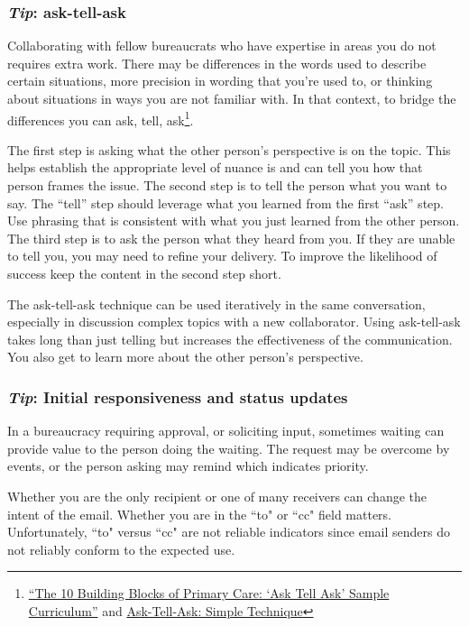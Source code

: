 \subsubsection*{\textit{Tip}: ask-tell-ask}

Collaborating with fellow bureaucrats who have expertise in areas you do not requires extra work. There may be differences in the words used to describe certain situations, more precision in wording that you're used to, or thinking about situations in ways you are not familiar with. In that context, to bridge the differences you can ask, tell, ask\footnote{\href{https://cepc.ucsf.edu/sites/cepc.ucsf.edu/files/Curriculum_sample_14-0602.pdf}{``The 10 Building Blocks of Primary Care: `Ask Tell Ask' Sample Curriculum''} and \href{https://www.the-hospitalist.org/hospitalist/article/125126/qi-initiatives/ask-tell-ask-simple-technique-can-help-hospitalists}{Ask-Tell-Ask: Simple Technique}}. 

The first step is asking what the other person's perspective is on the topic. This helps establish the appropriate level of nuance is and can tell you how that person frames the issue. The second step is to tell the person what you want to say. The ``tell'' step should leverage what you learned from the first ``ask'' step. Use phrasing that is consistent with what you just learned from the other person. The third step is to ask the person what they heard from you. If they are unable to tell you, you may need to refine your delivery. To improve the likelihood of success keep the content in the second step short. 

The ask-tell-ask technique can be used iteratively in the same conversation, especially in discussion complex topics with a new collaborator. 
Using ask-tell-ask takes long than just telling but increases the effectiveness of the communication. You also get to learn more about the other person's perspective. 


\subsubsection*{\textit{Tip}: Initial responsiveness and status updates}
In a bureaucracy requiring approval, or soliciting input, sometimes waiting can provide value to the person doing the waiting. The request may be overcome by events, or the person asking may remind which indicates priority.



Whether you are the only recipient or one of many receivers can change the intent of the email. Whether you are in the ``to" or ``cc" field matters. Unfortunately, ``to" versus ``cc" are not reliable indicators since email senders do not reliably conform to the expected use. 


